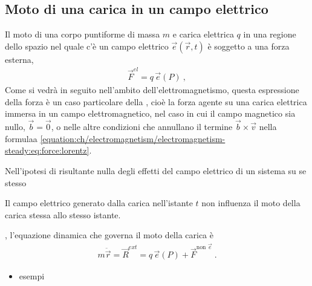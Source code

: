 \documentclass[letterpaper,10pt,italian]{jupyterBook}
\begin{document}
\subsection{Moto di una carica in un campo elettrico}
\label{\detokenize{ch/electromagnetism/electrostatics:moto-di-una-carica-in-un-campo-elettrico}}\label{\detokenize{ch/electromagnetism/electrostatics:physics-hs-electromagnetism-lorentz-electric}}
\sphinxAtStartPar
Il moto di una corpo puntiforme di massa \(m\) e carica elettrica \(q\) in una regione dello spazio nel quale c’è un campo elettrico \(\vec{e}(\vec{r},t)\) è soggetto a una forza esterna,
\begin{equation}\label{equation:ch/electromagnetism/electrostatics:eq:force:lorentz:electric}
\begin{split}\vec{F}^{el} = q \, \vec{e}(P) \ ,\end{split}
\end{equation}
\sphinxAtStartPar
Come si vedrà in seguito nell’ambito dell’elettromagnetismo, questa espressione della forza è un caso particolare della {\hyperref[\detokenize{ch/electromagnetism/electromagnetism-steady:physics-hs-electromagnetism-lorentz}]{}}, cioè la forza agente su una carica elettrica immersa in un campo elettromagnetico, nel caso in cui il campo magnetico sia nullo, \(\vec{b} = \vec{0}\), o nelle altre condizioni che annullano il termine \(\vec{b} \times \vec{v}\) nella formulaa \eqref{equation:ch/electromagnetism/electromagnetism-steady:eq:force:lorentz}.

\sphinxAtStartPar
Nell’ipotesi di risultante nulla degli effetti del campo elettrico di un sistema su se stesso%
\begin{footnote}[1]\sphinxAtStartFootnote
Il campo elettrico generato dalla carica nell’istante \(t\) non influenza il moto della carica stessa allo stesso istante.
%
\end{footnote}, l’equazione dinamica che governa il moto della carica è
\begin{equation*}
\begin{split}m \ddot{ \vec{r} } = \vec{R}^{ext} = q \, \vec{e}(P) + \vec{F}^{\text{non }\vec{e}} \ .\end{split}
\end{equation*}\begin{itemize}
\item {} 
\sphinxAtStartPar
{} esempi

\end{itemize}
\end{document}
